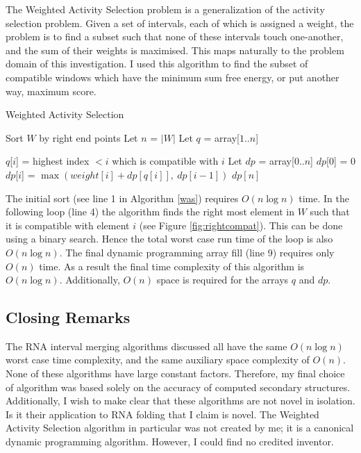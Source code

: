 \documentclass{cshonours}
\begin{document}
The Weighted Activity Selection problem is a generalization of the activity selection problem. Given a set of intervals, each of which is assigned a weight, the problem is to find a subset such that none of these intervals touch one-another, and the sum of their weights is maximised. This maps naturally to the problem domain of this investigation. I used this algorithm to find the subset of compatible windows which have the minimum sum free energy, or put another way, maximum score.

\begin{algorithm}
  \caption{Weighted Activity Selection}
  \label{was}
  \begin{algorithmic}[1]
  \State Sort $W$ by right end points
  \State Let $n$ = $|W|$
  \State Let $q$ = array[$1..n$]
  
  	\State $q$[$i$] = highest index $< i$ which is compatible with $i$
  \EndFor
  \State Let $dp$ = array[$0..n$]  
  \State $dp$[0] = 0
  	\State $dp$[$i$] = $\max (weight[i] + dp[q[i]], \: dp[i-1])$
  \EndFor
  \State \Return $dp[n]$
  \end{algorithmic}
\end{algorithm}

The initial sort (see line 1 in Algorithm \ref{was}) requires $O(n \log n)$ time. In the following loop (line 4) the algorithm finds the right most element in $W$ such that it is compatible with element $i$ (see Figure \ref{fig:rightcompat}). This can be done using a binary search. Hence the total worst case run time of the loop is also $O(n \log n)$. The final dynamic programming array fill (line 9) requires only $O(n)$ time. As a result the final time complexity of this algorithm is $O(n \log n)$. Additionally, $O(n)$ space is required for the arrays $q$ and $dp$.


\subsection{Closing Remarks}

The RNA interval merging algorithms discussed all have the same $O(n \log n)$ worst case time complexity, and the same auxiliary space complexity of $O(n)$. None of these algorithms have large constant factors. Therefore, my final choice of algorithm was based solely on the accuracy of computed secondary structures. Additionally, I wish to make clear that these algorithms are not novel in isolation. Is it their application to RNA folding that I claim is novel. The Weighted Activity Selection algorithm in particular was not created by me; it is a canonical dynamic programming algorithm. However, I could find no credited inventor.
\end{document}
